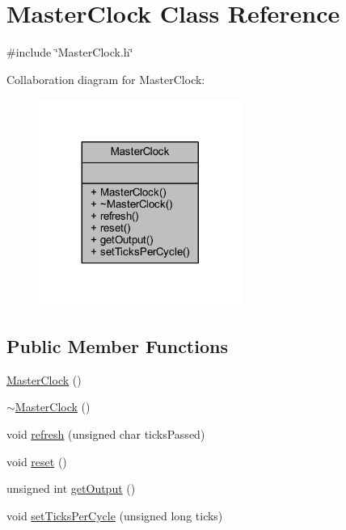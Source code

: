 \hypertarget{class_master_clock}{}\section{Master\+Clock Class Reference}
\label{class_master_clock}


{\ttfamily \#include \char`\"{}Master\+Clock.\+h\char`\"{}}



Collaboration diagram for Master\+Clock\+:
\nopagebreak
\begin{figure}[H]
\begin{center}
\leavevmode
\includegraphics[width=188pt]{d1/d2a/class_master_clock__coll__graph}
\end{center}
\end{figure}
\subsection*{Public Member Functions}
\begin{DoxyCompactItemize}
\item 
\hyperlink{class_master_clock_a479dec94c2b2061cca4fd9ce6a8b207a}{Master\+Clock} ()
\item 
\hyperlink{class_master_clock_aa7ff1a5f175a32f2a1d1b05a9c5ecf53}{$\sim$\+Master\+Clock} ()
\item 
void \hyperlink{class_master_clock_ae6c0b35db2932b94ec823eac80347707}{refresh} (unsigned char ticks\+Passed)
\item 
void \hyperlink{class_master_clock_a21abae82a775a527de35a198859ce965}{reset} ()
\item 
unsigned int \hyperlink{class_master_clock_af63318129f4c13824614e73f549e5894}{get\+Output} ()
\item 
void \hyperlink{class_master_clock_a5df4dcf8523b8186a7c73f9357376a01}{set\+Ticks\+Per\+Cycle} (unsigned long ticks)
\end{DoxyCompactItemize}


